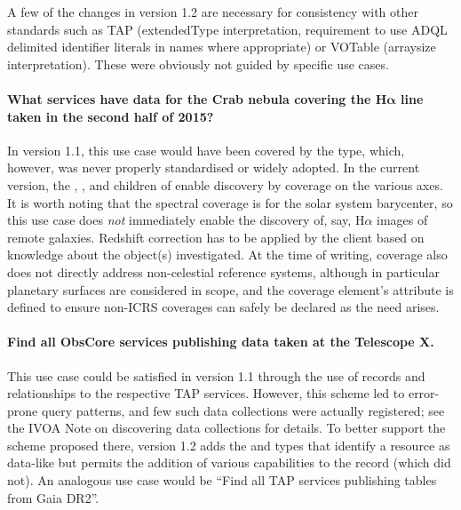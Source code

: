\documentclass[11pt,a4paper]{ivoa}
\begin{document}
A few of the changes in version 1.2 are necessary for consistency with other standards
such as TAP (extendedType interpretation, requirement to use ADQL
delimited identifier literals in names where appropriate) or VOTable
(arraysize interpretation).  These were obviously not guided by specific
use cases.


\paragraph{What services have data for the Crab nebula covering the
H$\boldsymbol\alpha$
line taken in the second half of 2015?}  In version 1.1, this use case
would have been covered by the  type,
which, however, was never properly standardised or widely adopted.  In the current
version, the , , and 
children of  enable discovery by coverage on the various
axes.  It is worth noting that the spectral coverage is for the solar
system barycenter, so this use case does \emph{not} immediately enable
the discovery of, say, H$\alpha$ images of remote galaxies.  Redshift
correction has to be applied by the client based on knowledge about the
object(s) investigated.  At the time of writing, coverage also does not
directly address non-celestial reference systems, although in particular
planetary surfaces are considered in scope, and the coverage element's
 attribute is defined to ensure non-ICRS coverages can
safely be declared as the need arises.

\paragraph{Find all ObsCore services publishing data taken at the
Telescope X.} This use case could be satisfied in version 1.1 through
the use of  records and relationships to the
respective TAP services.  However, this scheme led to error-prone query
patterns, and few such data collections were actually registered; see
the IVOA Note on discovering data collections \citep{2019ivoa.spec.0520D} for
details.  To better support the scheme proposed there, version 1.2 adds
the  and  types
that identify a resource as data-like but
permits the addition of various capabilities to the record (which
 did not).  An analogous use case would be
``Find all TAP services publishing tables from Gaia DR2''.
\end{document}
